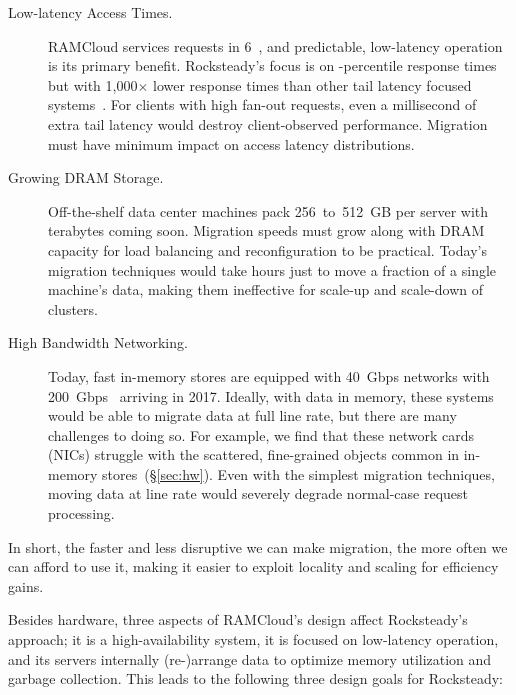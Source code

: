 \begin{description}
\item[Low-latency Access Times.]
RAMCloud services requests in 6~\us, and predictable, low-latency operation is
its primary benefit.  Rocksteady's focus is on \nnnth{}-percentile response
times but with 1,000$\times$ lower response times than other tail latency
focused systems~\cite{dynamo}. For clients with high fan-out requests, even
a millisecond of extra tail latency would destroy client-observed
performance. Migration must have minimum impact on access latency
distributions.

\item[Growing DRAM Storage.]
Off-the-shelf data center machines pack 256~to~512~GB per server
with terabytes coming soon. Migration speeds must
grow along with DRAM capacity for load balancing and reconfiguration to be
practical. Today's migration techniques would take hours
just to move a fraction of a single machine's data, making them ineffective for
scale-up and scale-down of clusters.

\item[High Bandwidth Networking.]
Today, fast in-memory stores are equipped with 40~Gbps networks with
200~Gbps~\cite{mellanox-cx6} arriving in 2017. Ideally, with data in memory, these
systems would be able to migrate data at full line rate, but there are many
challenges to doing so.  For example, we find that these network cards (NICs)
struggle with the scattered, fine-grained objects common in in-memory
stores~(\S\ref{sec:hw}).  Even with the simplest migration
techniques, moving data at line rate would severely degrade
normal-case request processing.

\end{description}

\noindent
In short, the faster and less disruptive we can make migration, the more often we can
afford to use it, making it easier to exploit locality and scaling for efficiency gains.

Besides hardware, three aspects of RAMCloud's design affect Rocksteady's
approach; it is a high-availability system, it is focused on low-latency
operation, and its servers internally (re-)arrange data to optimize memory
utilization and garbage collection. This leads to the following three design
goals for Rocksteady:

